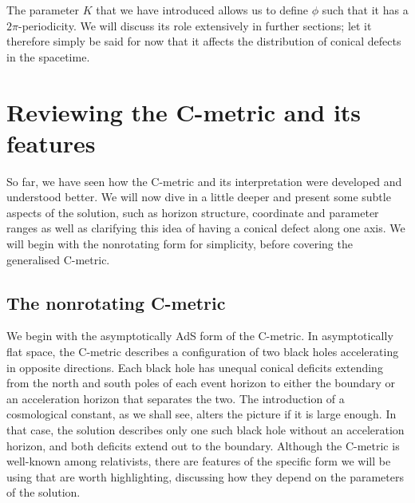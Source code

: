 \documentclass[
twoside,
openright,
frontopenright,
]{dmathesis}
\begin{document}
The parameter $K$ that we have introduced allows us to define $\phi$ such that
it has a $2\pi$-periodicity. We will discuss its role extensively in further
sections; let it therefore simply be said for now that it affects the
distribution of conical defects in the spacetime.


\section{Reviewing the C-metric and its features}
\label{sec:cmet-review}

So far, we have seen how the C-metric and its interpretation were developed and
understood better. We will now dive in a little deeper and present some subtle
aspects of the solution, such as horizon structure, coordinate and parameter
ranges as well as clarifying this idea of having a conical defect along one
axis. We will begin with the nonrotating form for simplicity, before covering
the generalised C-metric.

\subsection{The nonrotating C-metric}
We begin with the asymptotically AdS form of the C-metric. In
asymptotically flat space, the C-metric describes a configuration of two black
holes accelerating in opposite directions. Each black hole has unequal conical
deficits extending from the north and south poles of each event horizon to
either the boundary or an acceleration horizon that separates the two. The
introduction of a cosmological constant, as we shall see, alters the picture if
it is large enough. In that case, the solution describes only one such black
hole without an acceleration horizon, and both deficits extend out to the
boundary. Although the C-metric is well-known among relativists,
there are features of the specific form we will be using that are worth
highlighting, discussing how they depend on the parameters of the solution.
\end{document}
